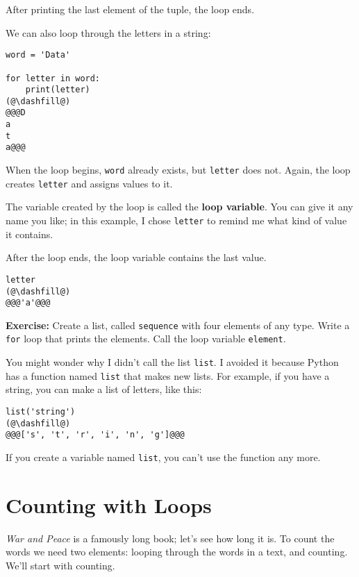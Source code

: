 After printing the last element of the tuple, the loop ends.

We can also loop through the letters in a string:

\begin{lstlisting}[]
word = 'Data'

for letter in word:
    print(letter)
(@\dashfill@)
@@@D
a
t
a@@@
\end{lstlisting}

When the loop begins, \passthrough{\lstinline!word!} already exists, but
\passthrough{\lstinline!letter!} does not. Again, the loop creates
\passthrough{\lstinline!letter!} and assigns values to it.

The variable created by the loop is called the \textbf{loop variable}.
You can give it any name you like; in this example, I chose
\passthrough{\lstinline!letter!} to remind me what kind of value it
contains.

After the loop ends, the loop variable contains the last value.

\begin{lstlisting}[]
letter
(@\dashfill@)
@@@'a'@@@
\end{lstlisting}

\textbf{Exercise:} Create a list, called
\passthrough{\lstinline!sequence!} with four elements of any type. Write
a \passthrough{\lstinline!for!} loop that prints the elements. Call the
loop variable \passthrough{\lstinline!element!}.

You might wonder why I didn't call the list
\passthrough{\lstinline!list!}. I avoided it because Python has a
function named \passthrough{\lstinline!list!} that makes new lists. For
example, if you have a string, you can make a list of letters, like
this:

\begin{lstlisting}[]
list('string')
(@\dashfill@)
@@@['s', 't', 'r', 'i', 'n', 'g']@@@
\end{lstlisting}

If you create a variable named \passthrough{\lstinline!list!}, you can't
use the function any more.

\hypertarget{counting-with-loops}{%
\section{Counting with Loops}\label{counting-with-loops}}

\emph{War and Peace} is a famously long book; let's see how long it is.
To count the words we need two elements: looping through the words in a
text, and counting. We'll start with counting.

